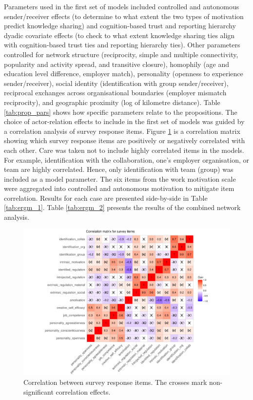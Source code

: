 Parameters used in the first set of models included controlled and autonomous sender/receiver effects (to determine to what extent the two types of motivation predict knowledge sharing) and cognition-based trust and reporting hierarchy dyadic covariate effects (to check to what extent knowledge sharing ties align with cognition-based trust ties and reporting hierarchy ties). Other parameters controlled for network structure (reciprocity, simple and multiple connectivity, popularity and activity spread, and transitive closure), homophily (age and education level difference, employer match), personality (openness to experience sender/receiver), social identity (identification with group sender/receiver), reciprocal exchanges across organisational boundaries (employer mismatch reciprocity), and geographic proximity (log of kilometre distance). Table \ref{tab:prop_pars} shows how specific parameters relate to the propositions. The choice of actor-relation effects to include in the first set of models was guided by a correlation analysis of survey response items. Figure \ref{fig:corr_analysis} is a correlation matrix showing which survey response items are positively or negatively correlated with each other. Care was taken not to include highly correlated items in the models. For example, identification with the collaboration, one's employer organisation, or team are highly correlated. Hence, only identification with team (group) was included as a model parameter. The six items from the work motivation scale were aggregated into controlled and autonomous motivation to mitigate item correlation. Results for each case are presented side-by-side in Table \ref{tab:ergm_1}. Table \ref{tab:ergm_2} presents the results of the combined network analysis. \medskip

\begin{figure}
    \centering
    \includegraphics[width = \textwidth]{Images/corr_plot.pdf}
    \caption[Correlation between survey response items]{Correlation between survey response items. The crosses mark non-significant correlation effects.}
    \label{fig:corr_analysis}
\end{figure}

